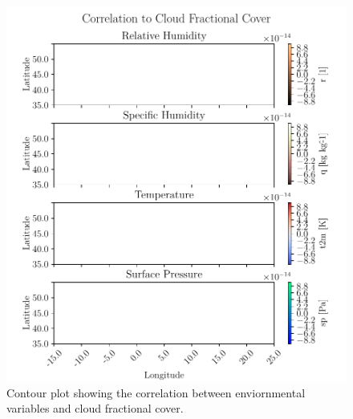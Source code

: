 \begin{figure}[ht]
    \centering
    \includegraphics{python_figs/correlation_figure.pdf}
    \caption{Contour plot showing the correlation between enviornmental variables and cloud fractional cover. }
    \label{fig:correlation_tcc_vs_envio}
\end{figure}


